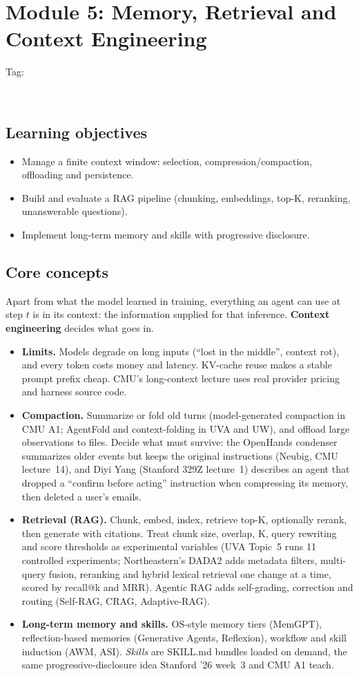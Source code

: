 \documentclass[10pt,oneside]{report}
\newcommand{\tg}[1]{{\setlength{\fboxsep}{1.2pt}\colorbox{tag#1}{\kern1pt\textcolor{white}{\sffamily\bfseries\fontsize{5.5}{6}\selectfont\strut #1}\kern1.5pt}}}
\begin{document}
\chapter{Module 5: Memory, Retrieval and Context Engineering}\hypertarget{mod-MEM}{}
{\small Tag: \tg{MEM}}
\section{Learning objectives}
\begin{itemize}
\item Manage a finite context window: selection, compression/compaction, offloading and persistence.
\item Build and evaluate a RAG pipeline (chunking, embeddings, top-K, reranking, unanswerable questions).
\item Implement long-term memory and skills with progressive disclosure.
\end{itemize}
\section{Core concepts}
Apart from what the model learned in training, everything an agent can use at step $t$ is in its context: the information supplied for that inference. \textbf{Context engineering} decides what goes in.
\begin{itemize}
\item \textbf{Limits.} Models degrade on long inputs (``lost in the middle'', context rot), and every token costs money and latency. KV-cache reuse makes a stable prompt prefix cheap. CMU's long-context lecture uses real provider pricing and harness source code.
\item \textbf{Compaction.} Summarize or fold old turns (model-generated compaction in CMU A1; AgentFold and context-folding in UVA and UW), and offload large observations to files. Decide what must survive: the OpenHands condenser summarizes older events but keeps the original instructions (Neubig, CMU lecture~14), and Diyi Yang (Stanford 329Z lecture~1) describes an agent that dropped a ``confirm before acting'' instruction when compressing its memory, then deleted a user's emails.
\item \textbf{Retrieval (RAG).} Chunk, embed, index, retrieve top-K, optionally rerank, then generate with citations. Treat chunk size, overlap, K, query rewriting and score thresholds as experimental variables (UVA Topic~5 runs 11 controlled experiments; Northeastern's DADA2 adds metadata filters, multi-query fusion, reranking and hybrid lexical retrieval one change at a time, scored by recall@k and MRR). Agentic RAG adds self-grading, correction and routing (Self-RAG, CRAG, Adaptive-RAG).
\item \textbf{Long-term memory and skills.} OS-style memory tiers (MemGPT), reflection-based memories (Generative Agents, Reflexion), workflow and skill induction (AWM, ASI). \emph{Skills} are SKILL.md bundles loaded on demand, the same progressive-disclosure idea Stanford '26 week~3 and CMU A1 teach.
\end{itemize}
\end{document}
